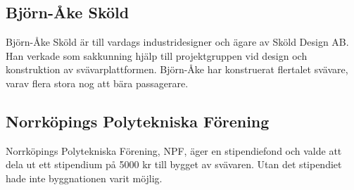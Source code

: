 \subsection{Björn-Åke Sköld}
Björn-Åke Sköld är till vardags industridesigner och ägare av Sköld Design AB.
Han verkade som sakkunning hjälp till projektgruppen vid design och konstruktion
av svävarplattformen. Björn-Åke har konstruerat flertalet svävare, varav flera
stora nog att bära passagerare.

\subsection{Norrköpings Polytekniska Förening}
Norrköpings Polytekniska Förening, NPF, äger en stipendiefond och valde att dela
ut ett stipendium på 5000 kr till bygget av svävaren. Utan det stipendiet hade
inte byggnationen varit möjlig.
